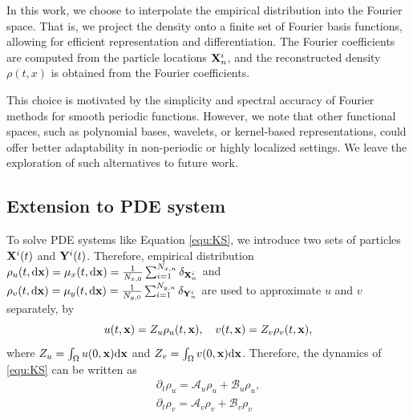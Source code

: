 \documentclass[12pt]{article}
\begin{document}
In this work, we choose to interpolate the empirical distribution into the Fourier space. That is, we project the density onto a finite set of Fourier basis functions, allowing for efficient representation and differentiation. The Fourier coefficients are computed from the particle locations $\mathbf{X}_n^i$, and the reconstructed density 
$\rho(t,x)$ is obtained from the Fourier coefficients.

This choice is motivated by the simplicity and spectral accuracy of Fourier methods for smooth periodic functions. However, we note that other functional spaces, such as polynomial bases, wavelets, or kernel-based representations, could offer better adaptability in non-periodic or highly localized settings. We leave the exploration of such alternatives to future work.

\subsection{Extension to PDE system}
To solve PDE systems like Equation \eqref{equ:KS}, we introduce two sets of particles $\mathbf{X}^i(t)$ and $\mathbf{Y}^i(t)$. Therefore, empirical distribution $\rho_u(t,\mathrm{d} \mathbf{x} ) = \mu_x(t,\mathrm{d} \mathbf{x}) =  \frac{1}{N_{x,0}}\sum_{i=1}^{N_{x,n}}\delta_{\mathbf{X}_n^i} $ and $\rho_v(t,\mathrm{d} \mathbf{x} ) = \mu_y(t,\mathrm{d} \mathbf{x}) =  \frac{1}{N_{y,0}}\sum_{i=1}^{N_{y,n}}\delta_{\mathbf{Y}_n^i}$ are used to approximate $u$ and $v$ separately, by 
\begin{equation}
    u(t,\mathbf{x}) =  Z_u \rho_u(t,\mathbf{x}), \quad v(t,\mathbf{x}) =  Z_v \rho_v(t,\mathbf{x}),
\end{equation}
where $Z_u = \int_\Omega u(0,\mathbf{x}) \mathrm{d} \mathbf{x}$ and $Z_v = \int_\Omega v(0,\mathbf{x}) \mathrm{d} \mathbf{x}$. Therefore, the dynamics of \eqref{equ:KS} can be written as 
\begin{equation}
    \begin{aligned}
        \partial_t \rho_u =  \mathcal A_u \rho_u + \mathcal B_u \rho_u,\\
        \partial_t \rho_v =  \mathcal A_v \rho_v + \mathcal B_v \rho_v
    \end{aligned}
\end{equation}
\end{document}
